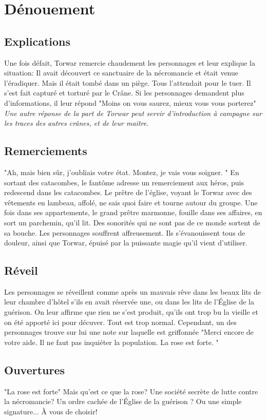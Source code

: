 \documentclass[a4paper, 11pt]{article}
\begin{document}
\section{Dénouement} 
\subsection{Explications}
Une fois défait, Torwar remercie chaudement les personnages et leur explique la situation: Il avait découvert ce sanctuaire de la nécromancie et était venue l'éradiquer. Mais il était tombé dans un piège. Tous l'attendait pour le tuer. Il s'est fait capturé et torturé par le Crâne. Si les personnages demandent plus d'informations, il leur répond "Moins on vous saurez, mieux vous vous porterez" \textit{Une autre réponse de la part de Torwar peut servir d'introduction à campagne sur les traces des autres crânes, et de leur maitre.}

\subsection{Remerciements}
"Ah, mais bien sûr, j’oubliais votre état. Montez, je vais vous soigner. " En sortant des catacombes, le fantôme adresse un remerciement aux héros, puis redescend dans les catacombes.
Le prêtre de l'église, voyant le Torwar avec des vêtements en lambeau, affolé, ne sais quoi faire et tourne autour du groupe. Une fois dans ses appartements, le grand prêtre marmonne, fouille dans ses affaires, en sort un parchemin, qu'il lit. Des sonorités qui ne sont pas de ce monde sortent de sa bouche. Les personnages souffrent affreusement. Ils s’évanouissent tous de douleur, ainsi que Torwar, épuisé par la puissante magie qu'il vient d'utiliser. 

\subsection{Réveil}
Les personnages se réveillent comme après un mauvais rêve dans les beaux lits de leur chambre d'hôtel s'ils en avait réservée une, ou dans les lits de l’Église de la guérison. On leur affirme que rien ne s'est produit, qu'ils ont trop bu la vieille et on été apporté ici pour décuver. Tout est trop normal.
\newline
Cependant, un des personnages trouve sur lui une note sur laquelle est griffonnée "Merci encore de votre aide. Il ne faut pas inquiéter la population. La rose est forte. "

\subsection{Ouvertures}
"La rose est forte" Mais qu'est ce que la rose? Une société secrète de lutte contre la nécromancie? Un ordre cachée de l'Église de la guérison ? Ou une simple signature... À vous de choisir!
\end{document}
